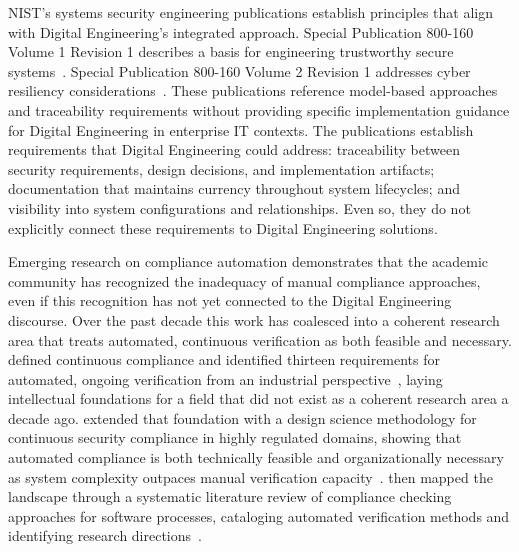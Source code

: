 NIST's systems security engineering publications establish principles that align with Digital Engineering's integrated approach. Special Publication 800-160 Volume 1 Revision 1 describes a basis for engineering trustworthy secure systems~\parencite{Ross_Winstead_McEvilley_2022}. Special Publication 800-160 Volume 2 Revision 1 addresses cyber resiliency considerations~\parencite{NIST_SP_800_160_V2_2021}. These publications reference model-based approaches and traceability requirements without providing specific implementation guidance for Digital Engineering in enterprise IT contexts. The publications establish requirements that Digital Engineering could address: traceability between security requirements, design decisions, and implementation artifacts; documentation that maintains currency throughout system lifecycles; and visibility into system configurations and relationships. Even so, they do not explicitly connect these requirements to Digital Engineering solutions.

Emerging research on compliance automation demonstrates that the academic community has recognized the inadequacy of manual compliance approaches, even if this recognition has not yet connected to the Digital Engineering discourse. Over the past decade this work has coalesced into a coherent research area that treats automated, continuous verification as both feasible and necessary. \citeauthor{Santilli_2023} defined continuous compliance and identified thirteen requirements for automated, ongoing verification from an industrial perspective~\parencite{Santilli_2023}, laying intellectual foundations for a field that did not exist as a coherent research area a decade ago. \citeauthor{Angermeir_2024} extended that foundation with a design science methodology for continuous security compliance in highly regulated domains, showing that automated compliance is both technically feasible and organizationally necessary as system complexity outpaces manual verification capacity~\parencite{Angermeir_2024}. \citeauthor{Castellanos_Ardila_2022} then mapped the landscape through a systematic literature review of compliance checking approaches for software processes, cataloging automated verification methods and identifying research directions~\parencite{Castellanos_Ardila_2022}.

